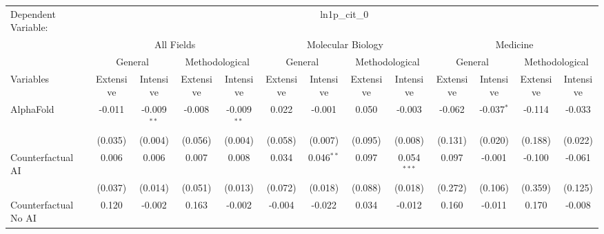 \begingroup
\centering
\begin{tabular}{lcccccccccccc}
   \tabularnewline \midrule \midrule
   Dependent Variable: & \multicolumn{12}{c}{ln1p\_cit\_0}\\
 & \multicolumn{4}{c}{All Fields} & \multicolumn{4}{c}{Molecular Biology} & \multicolumn{4}{c}{Medicine} \\
\cmidrule(lr){2-5} \cmidrule(lr){6-9} \cmidrule(lr){10-13}
 & \multicolumn{2}{c}{General} & \multicolumn{2}{c}{Methodological} & \multicolumn{2}{c}{General} & \multicolumn{2}{c}{Methodological} & \multicolumn{2}{c}{General} & \multicolumn{2}{c}{Methodological} \\
\cmidrule(lr){2-3} \cmidrule(lr){4-5} \cmidrule(lr){6-7} \cmidrule(lr){8-9} \cmidrule(lr){10-11} \cmidrule(lr){12-13}
Variables & \multicolumn{1}{c}{Extensive} & \multicolumn{1}{c}{Intensive} & \multicolumn{1}{c}{Extensive} & \multicolumn{1}{c}{Intensive} & \multicolumn{1}{c}{Extensive} & \multicolumn{1}{c}{Intensive} & \multicolumn{1}{c}{Extensive} & \multicolumn{1}{c}{Intensive} & \multicolumn{1}{c}{Extensive} & \multicolumn{1}{c}{Intensive} & \multicolumn{1}{c}{Extensive} & \multicolumn{1}{c}{Intensive} \\
\cmidrule(lr){1-1}\cmidrule(lr){2-2} \cmidrule(lr){3-3} \cmidrule(lr){4-4} \cmidrule(lr){5-5} \cmidrule(lr){6-6} \cmidrule(lr){7-7} \cmidrule(lr){8-8} \cmidrule(lr){9-9} \cmidrule(lr){10-10} \cmidrule(lr){11-11} \cmidrule(lr){12-12} \cmidrule(lr){13-13}
   AlphaFold                                & -0.011       & -0.009$^{**}$ & -0.008       & -0.009$^{**}$ & 0.022   & -0.001       & 0.050   & -0.003        & -0.062  & -0.037$^{*}$ & -0.114  & -0.033\\   
                                            & (0.035)      & (0.004)       & (0.056)      & (0.004)       & (0.058) & (0.007)      & (0.095) & (0.008)       & (0.131) & (0.020)      & (0.188) & (0.022)\\   
   Counterfactual AI                        & 0.006        & 0.006         & 0.007        & 0.008         & 0.034   & 0.046$^{**}$ & 0.097   & 0.054$^{***}$ & 0.097   & -0.001       & -0.100  & -0.061\\   
                                            & (0.037)      & (0.014)       & (0.051)      & (0.013)       & (0.072) & (0.018)      & (0.088) & (0.018)       & (0.272) & (0.106)      & (0.359) & (0.125)\\   
   Counterfactual No AI                     & 0.120        & -0.002        & 0.163        & -0.002        & -0.004  & -0.022       & 0.034   & -0.012        & 0.160   & -0.011       & 0.170   & -0.008\\   

\end{tabular}

